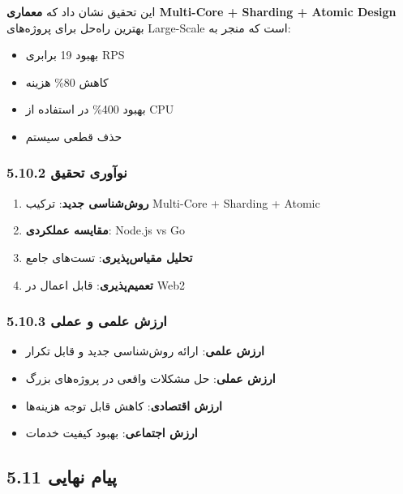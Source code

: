 \documentclass[
]{article}
\providecommand{\tightlist}{%
  \setlength{\itemsep}{0pt}\setlength{\parskip}{0pt}}
\begin{document}
این تحقیق نشان داد که \textbf{معماری Multi-Core + Sharding + Atomic
Design} بهترین راه‌حل برای پروژه‌های Large-Scale است که منجر به:

\begin{itemize}
\tightlist
\item
  بهبود 19 برابری RPS
\item
  کاهش 80\% هزینه
\item
  بهبود 400\% در استفاده از CPU
\item
  حذف قطعی سیستم
\end{itemize}

\subsubsection{5.10.2 نوآوری
تحقیق}\label{ux646ux648ux622ux648ux631ux6cc-ux62aux62dux642ux6ccux642}

\begin{enumerate}
\def\labelenumi{\arabic{enumi}.}
\tightlist
\item
  \textbf{روش‌شناسی جدید}: ترکیب Multi-Core + Sharding + Atomic
\item
  \textbf{مقایسه عملکردی}: Node.js vs Go
\item
  \textbf{تحلیل مقیاس‌پذیری}: تست‌های جامع
\item
  \textbf{تعمیم‌پذیری}: قابل اعمال در Web2
\end{enumerate}

\subsubsection{5.10.3 ارزش علمی و
عملی}\label{ux627ux631ux632ux634-ux639ux644ux645ux6cc-ux648-ux639ux645ux644ux6cc}

\begin{itemize}
\tightlist
\item
  \textbf{ارزش علمی}: ارائه روش‌شناسی جدید و قابل تکرار
\item
  \textbf{ارزش عملی}: حل مشکلات واقعی در پروژه‌های بزرگ
\item
  \textbf{ارزش اقتصادی}: کاهش قابل توجه هزینه‌ها
\item
  \textbf{ارزش اجتماعی}: بهبود کیفیت خدمات
\end{itemize}

\subsection{5.11 پیام
نهایی}\label{ux67eux6ccux627ux645-ux646ux647ux627ux6ccux6cc}
\end{document}
